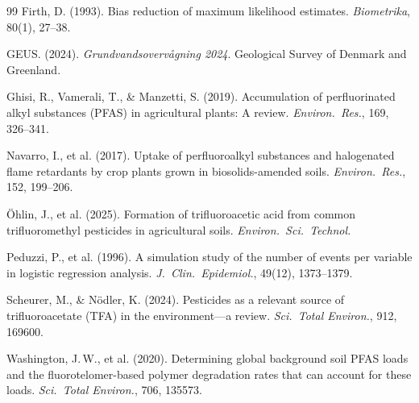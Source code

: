 \documentclass[12pt,a4paper]{article}
\begin{document}
\begin{thebibliography}{99}
 Firth, D. (1993). Bias reduction of maximum likelihood estimates. \textit{Biometrika}, 80(1), 27--38.

 GEUS. (2024). \textit{Grundvandsoverv\aa gning 2024}. Geological Survey of Denmark and Greenland.

 Ghisi, R., Vamerali, T., \& Manzetti, S. (2019). Accumulation of perfluorinated alkyl substances (PFAS) in agricultural plants: A review. \textit{Environ.\ Res.}, 169, 326--341.

 Navarro, I., et al. (2017). Uptake of perfluoroalkyl substances and halogenated flame retardants by crop plants grown in biosolids-amended soils. \textit{Environ.\ Res.}, 152, 199--206.

 \"Ohlin, J., et al. (2025). Formation of trifluoroacetic acid from common trifluoromethyl pesticides in agricultural soils. \textit{Environ.\ Sci.\ Technol.}

 Peduzzi, P., et al. (1996). A simulation study of the number of events per variable in logistic regression analysis. \textit{J.\ Clin.\ Epidemiol.}, 49(12), 1373--1379.

 Scheurer, M., \& N\"odler, K. (2024). Pesticides as a relevant source of trifluoroacetate (TFA) in the environment---a review. \textit{Sci.\ Total Environ.}, 912, 169600.

 Washington, J.\,W., et al. (2020). Determining global background soil PFAS loads and the fluorotelomer-based polymer degradation rates that can account for these loads. \textit{Sci.\ Total Environ.}, 706, 135573.

\end{thebibliography}
\end{document}
